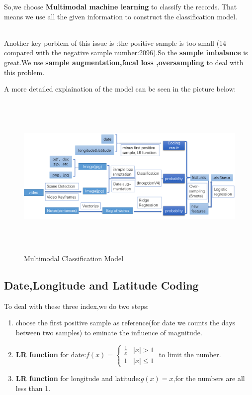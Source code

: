 \documentclass[12pt]{article}
\begin{document}
So,we choose \textbf{Multimodal machine learning} to classify the records.
That means we use all the given information to construct the classification model.

\quad \\
Another key porblem of this issue is :the positive sample is too small (14 compared with the negative sample number:2096).So the \textbf{sample imbalance} is great.We use \textbf{sample augmentation,focal loss ,oversampling} to deal with this problem.

A more detailed explaination of the model can be seen in the picture below:
\begin{figure}[H]
	\centering
	\includegraphics[width=18cm,height=8cm]{./pictures/problem2.png}
	\caption{Multimodal Classification Model}\label{nt}
\end{figure}


\subsection{Date,Longitude and Latitude Coding}
To deal with these three index,we do two steps:
\begin{enumerate}
	\item choose the first positive sample as reference(for date we counts the days between two samples) to eminate the influence of magnitude.
	\item \textbf{ LR function} for date:$f(x)=\left\{\begin{matrix}
	\frac{1}{x} & |x|>1 \\ 
	1 & |x|\leq 1
	\end{matrix}\right.$ to limit the number.
	\item \textbf{ LR function} for longitude and latitude:$g(x)=x$,for the numbers are all less than 1.
\end{enumerate} 
\end{document}
